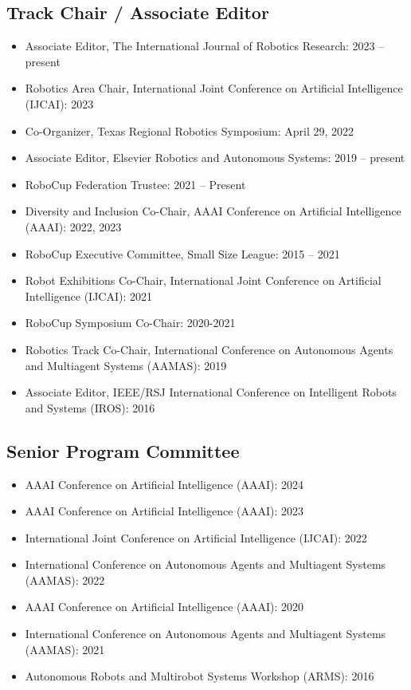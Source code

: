 \documentclass[Times]{article}
\begin{document}
\subsection*{Track Chair / Associate Editor}

\begin{itemize}
  \item Associate Editor, The International Journal of Robotics Research: 2023 -- present
  \item Robotics Area Chair, International Joint Conference on Artificial Intelligence (IJCAI): 2023
  \item Co-Organizer, Texas Regional Robotics Symposium: April 29, 2022
  \item Associate Editor, Elsevier Robotics and Autonomous Systems: 2019 -- present
  \item RoboCup Federation Trustee: 2021 -- Present
  \item Diversity and Inclusion Co-Chair, AAAI Conference on Artificial
  Intelligence (AAAI): 2022, 2023
  \item RoboCup Executive Committee, Small Size League: 2015 -- 2021
  \item Robot Exhibitions Co-Chair, International Joint Conference on Artificial Intelligence (IJCAI): 2021
  \item RoboCup Symposium Co-Chair: 2020-2021
\item Robotics Track Co-Chair, International Conference on Autonomous Agents and
Multiagent Systems (AAMAS): 2019
  \item Associate Editor, IEEE/RSJ International Conference on Intelligent
Robots and Systems (IROS): 2016
\end{itemize}

\subsection*{Senior Program Committee}
\begin{itemize}
  \item AAAI Conference on Artificial Intelligence (AAAI): 2024
  \item AAAI Conference on Artificial Intelligence (AAAI): 2023
  \item International Joint Conference on Artificial Intelligence (IJCAI): 2022
  \item International Conference on Autonomous Agents and Multiagent Systems
  (AAMAS): 2022
  \item AAAI Conference on Artificial Intelligence (AAAI): 2020
  \item International Conference on Autonomous Agents and Multiagent Systems
  (AAMAS): 2021
  \item Autonomous Robots and Multirobot Systems Workshop (ARMS): 2016
\end{itemize}
\end{document}
